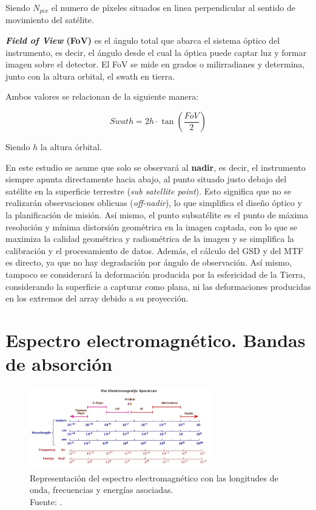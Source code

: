 Siendo $N_{pix}$ el numero de píxeles situados en linea perpendicular al sentido de movimiento del satélite.

\textbf{\textit{Field of View} (FoV)} es el ángulo total que abarca el sistema óptico del instrumento, es decir, el ángulo desde el cual la óptica puede captar luz y formar imagen sobre el detector. El FoV se mide en grados o milirradianes y determina, junto con la altura orbital, el swath en tierra.


Ambos valores se relacionan de la siguiente manera:

\begin{equation}
\label{fov}
Swath = 2h \cdot \tan \left( \frac{FoV}{2} \right)
\end{equation}

Siendo $h$ la altura órbital.

En este estudio se asume que solo se observará al \textbf{nadir}, es decir, el instrumento siempre apunta directamente hacia abajo, al punto situado justo debajo del satélite en la superficie terrestre (\textit{sub satellite point}). Esto significa que no se realizarán observaciones oblicuas (\textit{off-nadir}), lo que simplifica el diseño óptico y la planificación de misión. Así mismo, el punto subsatélite es el punto de máxima resolución y mínima distorsión geométrica en la imagen captada, con lo que se maximiza la calidad geométrica y radiométrica de la imagen y se simplifica la calibración y el procesamiento de datos. Además, el cálculo del GSD y del MTF es directo, ya que no hay degradación por ángulo de observación. Así mismo, tampoco se considerará la deformación producida por la esfericidad de la Tierra, considerando la superficie a capturar como plana, ni las deformaciones producidas en los extremos del array debido a su proyección.

\section{Espectro electromagnético. Bandas de absorción}

\begin{figure}[H]
    \centering
    \includegraphics[width=0.7\textwidth]{3.Conceptos_Previos/emspec.jpg}
    \caption{Representación del espectro electromagnético con las longitudes de onda, frecuencias y energías asociadas. \\ Fuente: \cite{WikiLecturesSpectrum}.}
    \label{fig:emspec}
\end{figure}

